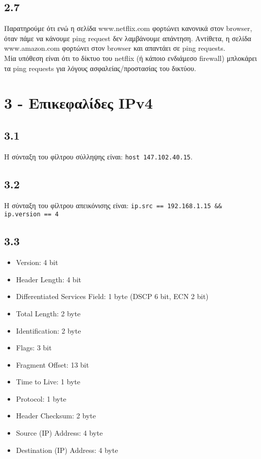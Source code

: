 		\subsection*{2.7}
			Παρατηρούμε ότι ενώ η σελίδα www.netflix.com φορτώνει κανονικά στον browser, όταν πάμε να κάνουμε ping request δεν λαμβάνουμε απάντηση. Αντίθετα, η σελίδα www.amazon.com φορτώνει στον browser και απαντάει σε ping requests. \\
			
			Μία υπόθεση είναι ότι το δίκτυο του netflix (ή κάποιο ενδιάμεσο firewall) μπλοκάρει τα ping requests για λόγους ασφαλείας/προστασίας του δικτύου.

	
	\section*{3 - Επικεφαλίδες IPv4}

		\subsection*{3.1}
			Η σύνταξη του φίλτρου σύλληψης είναι: \verb|host 147.102.40.15|.

		\subsection*{3.2}
			Η σύνταξη του φίλτρου απεικόνισης είναι: \verb|ip.src == 192.168.1.15 && ip.version == 4|			

		\subsection*{3.3} 
			\begin{itemize}
				\item Version: 4 bit
				\item Header Length: 4 bit
				\item Differentiated Services Field: 1 byte (DSCP 6 bit, ECN 2 bit)
				\item Total Length: 2 byte
				\item Identification: 2 byte
				\item Flags: 3 bit 
				\item Fragment Offset: 13 bit
				\item Time to Live: 1 byte
				\item Protocol: 1 byte
				\item Header Checksum: 2 byte
				\item Source (IP) Address: 4 byte
				\item Destination (IP) Address: 4 byte
			\end{itemize}
			
